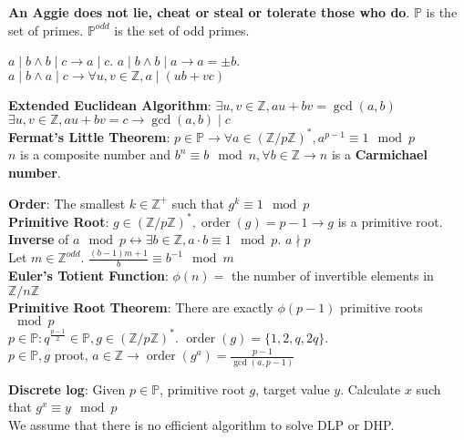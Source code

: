 \documentclass[10pt]{article}
\DeclareMathOperator{\ord}{order}
\begin{document}
\begin{multicols}{2}
    \noindent
    \textbf{An Aggie does not lie, cheat or steal or tolerate those who do}. $\mathbb{P}$ is the set of primes. $\mathbb{P}^{odd}$ is the set of odd primes.

    \noindent
    $a\mid b\land b\mid c\rightarrow a\mid c$.
    $a\mid b\land b\mid a\rightarrow a=\pm b$.\\
    $a\mid b\land a\mid c\rightarrow \forall u,v\in\mathbb{Z},a\mid(ub+vc)$

    \noindent
    \textbf{Extended Euclidean Algorithm}: $\exists u,v\in\mathbb{Z},au+bv=\gcd(a,b)$\\
    $\exists u,v\in\mathbb{Z},au+bv=c\rightarrow\gcd(a,b)\mid c$\\
    \textbf{Fermat's Little Theorem}: $p\in\mathbb{P}\rightarrow \forall a\in(\mathbb{Z}/p\mathbb{Z})^*,a^{p-1}\equiv 1\mod{p}$\\
    $n$ is a composite number and $b^n\equiv b\mod{n},\forall b\in\mathbb{Z}\rightarrow n$ is a \textbf{Carmichael number}.

    \noindent
    \textbf{Order}: The smallest $k\in\mathbb{Z^+}$ such that $g^k\equiv 1\mod{p}$\\
    \textbf{Primitive Root}: $g\in(\mathbb{Z}/p\mathbb{Z})^*,\ord(g)=p-1\rightarrow g$ is a primitive root.\\
    \textbf{Inverse} of $a \mod p \leftrightarrow \exists b\in\mathbb{Z},a\cdot b \equiv 1 \mod p$. $a \nmid p$\\
    Let $m\in\mathbb{Z}^{odd}$. $\frac{(b-1)m+1}{b}\equiv b^{-1}\mod{m}$\\
    \textbf{Euler's Totient Function}: $\phi(n)=$ the number of invertible elements in $\mathbb{Z}/n\mathbb{Z}$\\
    \textbf{Primitive Root Theorem}: There are exactly $\phi(p-1)$ primitive roots $\mod{p}$\\
    $p\in \mathbb{P} : q^{\frac{p-1}{2}} \in \mathbb{P}, g \in (\mathbb Z / p \mathbb{Z})^*$. $\ord{(g)}=\{1,2,q,2q\}$.\\
    $p\in \mathbb{P},g$ proot, $a\in\mathbb{Z}\rightarrow \ord{(g^a)}=\frac{p-1}{\gcd(a,p-1)}$

    \noindent
    \textbf{Discrete log}: Given $p\in\mathbb{P}$, primitive root $g$, target value $y$. Calculate $x$ such that $g^{x}\equiv y\mod{p}$\\
    We assume that there is no efficient algorithm to solve DLP or DHP.


\end{multicols}
\end{document}
